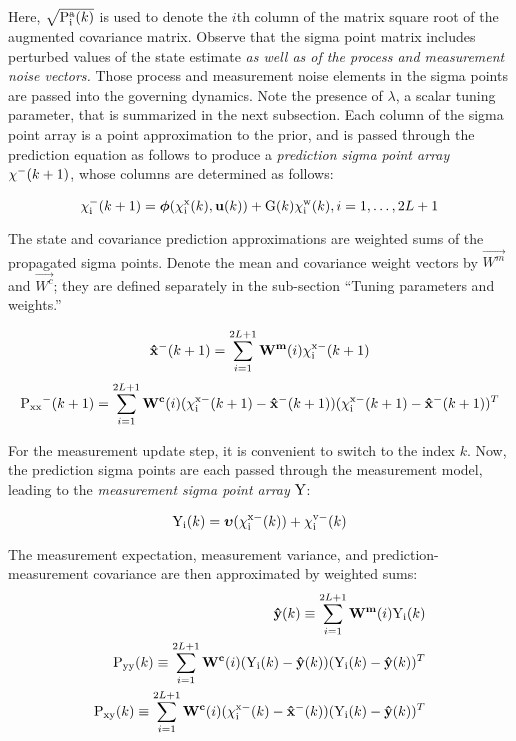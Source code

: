 Here, $\sqrt{\mathrm{P^a_i}(k)}$ is used to denote the $i$th column of the matrix square root of the augmented covariance matrix.
Observe that the sigma point matrix includes perturbed values of the state estimate \textit{as well as of the process and measurement noise vectors.}
Those process and measurement noise elements in the sigma points are passed into the governing dynamics.
Note the presence of $\lambda$, a scalar tuning parameter, that is summarized in the next subsection.
Each column of the sigma point array is a point approximation to the prior, and is passed through the prediction equation as follows to produce a \textit{prediction sigma point array} $\mathrm{\chi^-}(k+1)$, whose columns are determined as follows:

\begin{equation}
\mathrm{\chi^-_i}(k+1) = {\mathrm{\boldsymbol{\phi}}}(\mathrm{\chi^x_i}(k),\mathrm{\mathbf{u}}(k)) + {\mathrm{G}}(k) \mathrm{\chi^w_i}(k), i = 1, \dots, 2L+1
\end{equation}

The state and covariance prediction approximations are weighted sums of the propagated sigma points. Denote the mean and covariance weight vectors by $\vec{W^m}$ and $\vec{W^c}$; they are defined separately in the sub-section ``Tuning parameters and weights.''

\begin{equation}
\mathrm{\mathbf{\hat{x}^-}}(k+1) = \sum_{i=1}^{2L+1} \mathrm{\mathbf{W^m}}(i) \mathrm{\chi^{x-}_i}(k+1)
\end{equation}
\begin{equation}
{\ensuremath{\mathrm{P_{xx}}}}^-(k+1) = \sum_{i=1}^{2L+1} \mathrm{\mathbf{W^c}}(i) (\mathrm{\chi^{x-}_i}(k+1)-\mathrm{\mathbf{\hat{x}^-}}(k+1))(\mathrm{\chi^{x-}_i}(k+1)-\mathrm{\mathbf{\hat{x}^-}}(k+1))^T
\end{equation}

For the measurement update step, it is convenient to switch to the index $k$.
Now, the prediction sigma points are each passed through the measurement model, leading to the \textit{measurement sigma point array} $\mathrm{Y}$:

\begin{equation}
\mathrm{Y_i}(k) = {\mathrm{\boldsymbol{\upsilon}}}(\mathrm{\chi^{x-}_i}(k)) + \mathrm{\chi^{v-}_i}(k)
\end{equation}

The measurement expectation, measurement variance, and prediction-measurement covariance are then approximated by weighted sums:
\begin{align}
\mathrm{\mathbf{\hat{y}}}(k) \equiv \sum_{i=1}^{2L+1} \mathrm{\mathbf{W^m}}(i) \mathrm{Y_i}(k) \\
\mathrm{P_{yy}}(k) \equiv \sum_{i=1}^{2L+1} \mathrm{\mathbf{W^c}}(i) (\mathrm{Y_i}(k)-\mathrm{\mathbf{\hat{y}}}(k))(\mathrm{Y_i}(k)-\mathrm{\mathbf{\hat{y}}}(k))^T
\\
\mathrm{P_{xy}}(k) \equiv \sum_{i=1}^{2L+1} \mathrm{\mathbf{W^c}}(i) (\mathrm{\chi^{x-}_i}(k)-\mathrm{\mathbf{\hat{x}^-}}(k))(\mathrm{Y_i}(k)-\mathrm{\mathbf{\hat{y}}}(k))^T
\end{align}

